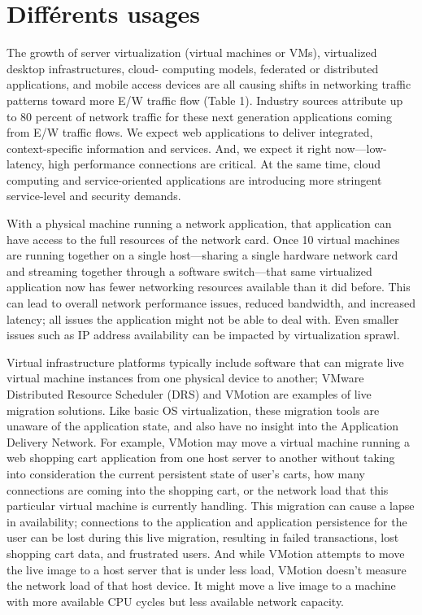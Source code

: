 \section{Différents usages}

The growth of server virtualization (virtual machines or VMs), virtualized desktop infrastructures, cloud- computing models, federated or distributed applications, and mobile access devices are all causing shifts in networking traffic patterns toward more E/W traffic flow (Table 1). Industry sources attribute up to 80 percent of network traffic for these next generation applications coming from E/W traffic flows.
We expect web applications to deliver integrated, context-specific information and services. And, we expect it right now—low-latency, high performance connections are critical. At the same time, cloud computing and service-oriented applications are introducing more stringent service-level and security demands.

With a physical machine running a network application, that application can have access to the full resources of the network card. Once 10 virtual machines are running together on a single host—sharing a single hardware network card and streaming together through a software switch—that same virtualized application now has fewer networking resources available than it did before. This can lead to overall network performance issues, reduced bandwidth, and increased latency; all issues the application might not be able to deal with. Even smaller issues such as IP address availability can be impacted by virtualization sprawl.

Virtual infrastructure platforms typically include software that can migrate
live virtual machine instances from one physical device to another; VMware Distributed Resource Scheduler (DRS) and VMotion are examples of live migration solutions. Like basic OS virtualization, these migration tools are unaware of the application state, and also have no insight into the Application Delivery Network. For example, VMotion may move a virtual machine running a web shopping cart application from one host server to another without taking into consideration
the current persistent state of user’s carts, how many connections are coming into the shopping cart, or the network load that this particular virtual machine is currently handling. This migration can cause a lapse in availability; connections to the application and application persistence for the user can be lost during this live migration, resulting in failed transactions, lost shopping cart data, and frustrated users. And while VMotion attempts to move the live image to a host server that is under less load, VMotion doesn’t measure the network load of that host device. It might move a live image to a machine with more available CPU cycles but less available network capacity.



